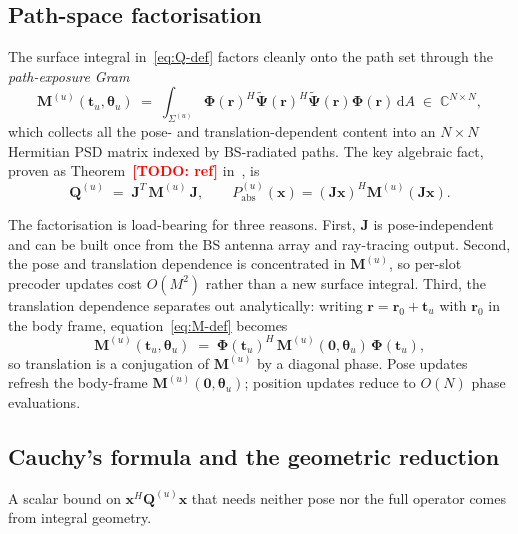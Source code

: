\documentclass[journal,twoside,onecolumn]{IEEEtran}
\theoremstyle{definition}
\newcommand{\TODO}[1]{\textcolor{red}{\textbf{[TODO: #1]}}}
\newcommand{\rr}{\mathbf{r}}
\newcommand{\xx}{\mathbf{x}}
\newcommand{\Pabs}{P_{\mathrm{abs}}}
\newcommand{\Q}{\mathbf{Q}}
\newcommand{\Jmat}{\mathbf{J}}
\newcommand{\Mmat}{\mathbf{M}}
\newcommand{\Phimat}{\mathbf{\Phi}}
\newcommand{\Psitil}{\tilde{\bm{\Psi}}}
\newcommand{\Complex}{\mathbb{C}}
\begin{document}
\subsection{Path-space factorisation}\label{sec:path-space}

The surface integral in~\eqref{eq:Q-def} factors cleanly onto the
path set through the \emph{path-exposure Gram}
\begin{equation}\label{eq:M-def}
  \Mmat^{(u)}(\mathbf{t}_u,\bm\theta_u)\;=\;
  \int_{\Sigma^{(u)}}\Phimat(\rr)^H\Psitil(\rr)^H
  \Psitil(\rr)\Phimat(\rr)\,\mathrm{d}A\;\in\;\Complex^{N\times N},
\end{equation}
which collects all the pose- and translation-dependent content
into an $N\times N$ Hermitian PSD matrix indexed by BS-radiated
paths. The key algebraic fact, proven as Theorem~\TODO{ref}
in~\cite{SystemFormalism}, is
\begin{equation}\label{eq:Q-JMJ}
  \boxed{\;
  \Q^{(u)}\;=\;\Jmat^T\,\Mmat^{(u)}\,\Jmat,\qquad
  \Pabs^{(u)}(\xx)=(\Jmat\xx)^H\Mmat^{(u)}(\Jmat\xx).
  \;}
\end{equation}

The factorisation is load-bearing for three reasons. First,
$\Jmat$ is pose-independent and can be built once from the BS
antenna array and ray-tracing output. Second, the pose and
translation dependence is concentrated in $\Mmat^{(u)}$, so
per-slot precoder updates cost $O(M^2)$ rather than a new surface
integral. Third, the translation dependence separates out
analytically: writing $\rr=\rr_0+\mathbf{t}_u$ with $\rr_0$ in the
body frame, equation~\eqref{eq:M-def} becomes
\begin{equation}\label{eq:M-translation}
  \Mmat^{(u)}(\mathbf{t}_u,\bm\theta_u)
  \;=\;\Phimat(\mathbf{t}_u)^H\,\Mmat^{(u)}(\bm{0},\bm\theta_u)\,
        \Phimat(\mathbf{t}_u),
\end{equation}
so translation is a conjugation of $\Mmat^{(u)}$ by a diagonal
phase. Pose updates refresh the body-frame
$\Mmat^{(u)}(\bm{0},\bm\theta_u)$; position updates reduce to
$O(N)$ phase evaluations.

\subsection{Cauchy's formula and the geometric reduction}
\label{sec:cauchy}

A scalar bound on $\xx^H\Q^{(u)}\xx$ that needs neither pose nor
the full operator comes from integral geometry.
\end{document}

